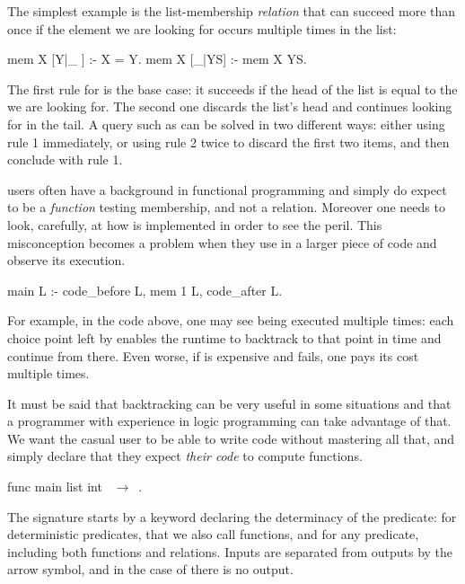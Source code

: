 The simplest example is the list-membership \emph{relation} that
can succeed more than once if the element we are looking for occurs multiple
times in the list:

\begin{elpicode}
mem X [Y|_ ] :- X = Y.    %
mem X [_|YS] :- mem X YS. %
\end{elpicode}

The first rule for 
is the base case: it succeeds if the head of the list is equal to the  we are
looking for. The second one discards the list's head and continues looking for
 in the tail.
A query such as  can be solved
in two different ways: either using rule 1 immediately, or using rule 2
twice to discard the first two items, and then conclude with rule 1. 

\elpi users often have a background in functional programming and simply do
expect  to be a \emph{function} testing membership, and not
a relation. Moreover one needs to look, carefully, at how  
is implemented in order to see the peril.
This misconception becomes a problem when they use 
in a larger piece of code and observe its execution.
%
\begin{elpicode}
main L :- code_before L, mem 1 L, code_after L.
\end{elpicode}
%
For example, in the code above, one may see  being executed
multiple times: each choice point left by  enables the runtime to
backtrack to that point in time and continue from there. Even worse, if
 is expensive and fails, one pays its cost  multiple times.

It must be said that backtracking can be very useful in some situations and
that a programmer with experience in logic programming can take advantage of
that. We want the \elpi casual user to be able to write code without mastering
all that, and simply declare that they expect \emph{their code} to
compute functions.
%
\begin{elpicode}
func main list int ~$\to$~. %
\end{elpicode}
%
The signature starts by a keyword declaring the determinacy of
the predicate: \efunc{} for deterministic predicates, that we also call functions,
and \epred{} for any predicate, including both functions and relations.
Inputs are separated from outputs by the
arrow symbol, and in the case of  there is no output.

